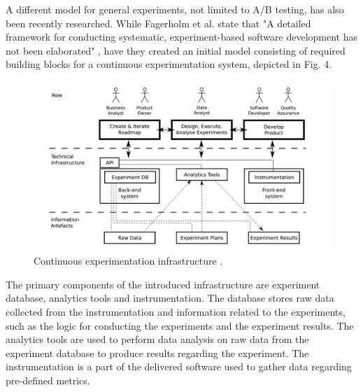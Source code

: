 \documentclass[english]{tktltiki2}
\theoremstyle{definition}
\theoremstyle{remark}
\begin{document}
A different model for general experiments, not limited to A/B testing, has also been recently researched. While Fagerholm et al. state that "A detailed framework for conducting systematic, experiment-based software development has not been elaborated" \cite{fagerholm2014building}, have they created an initial model consisting of required building blocks for a continuous experimentation system, depicted in Fig. 4. 

\begin{figure}[h]
	\centering
	\includegraphics[width=5in]{infra.jpg}
	\caption{Continuous experimentation infrastructure \cite{fagerholm2014building}.}
	\label{fig4}
\end{figure}

The primary components of the introduced infrastructure are experiment database, analytics tools and instrumentation. The database stores raw data collected from the instrumentation and information related to the experiments, such as the logic for conducting the experiments and the experiment results. The analytics tools are used to perform data analysis on raw data from the experiment database to produce results regarding the experiment. The instrumentation is a part of the delivered software used to gather data regarding pre-defined metrics.  
\end{document}

